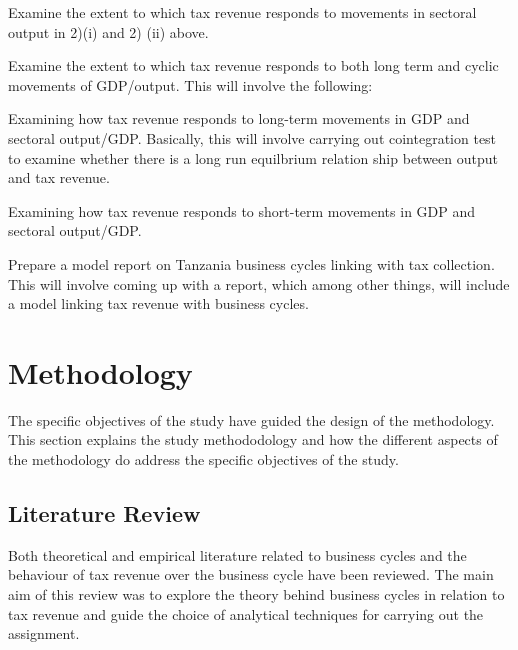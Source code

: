 \documentclass[12pt,a4paper,final]{article}
\begin{document}
\begin{compactenum}[1)]
\begin{compactenum}[(i)]
\item Examine the extent to which tax revenue responds to movements in sectoral output in 2)(i) and 2) (ii) above. 

\end{compactenum}

\item 	Examine the extent to which tax revenue responds to both long term and cyclic movements of GDP/output. This will involve the following:

\begin{compactenum}[(i)]
\item	Examining how tax revenue responds to long-term movements in GDP and sectoral output/GDP. Basically, this will involve carrying out cointegration test to examine whether there is a long run equilbrium relation ship between output and tax revenue.

\item Examining how tax revenue responds to short-term movements in GDP and sectoral output/GDP.  
\end{compactenum}

\item Prepare a model report on Tanzania business cycles linking with tax collection.  This will involve coming up with a report, which among other things, will include a model linking tax revenue with business cycles.
 
\end{compactenum}




\section{Methodology}
The specific objectives of the study have guided the design of the  methodology. This section explains the study methododology  and how the different aspects of the methodology do address the specific objectives of the study.

\subsection{Literature Review}

Both theoretical and empirical literature related to business cycles and the behaviour of tax revenue over the business cycle have been reviewed.  The main aim of this review was to explore the theory behind business cycles in relation to tax revenue and guide the choice of analytical techniques for carrying out the assignment.
\end{document}
